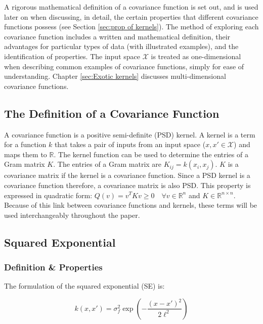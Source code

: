 \documentclass[12pt,a4paper]{article}
\begin{document}
A rigorous mathematical definition of a covariance function is set out, and is used later on when discussing, in detail, the certain properties that different covariance functions possess (see Section \ref{sec:prop of kernels}). The method of exploring each covariance function includes a written and mathematical definition, their advantages for particular types of data (with illustrated examples), and the identification of properties. The input space \(\mathcal{X}\) is treated as one-dimensional when describing common examples of covariance functions, simply for ease of understanding. Chapter \ref{sec:Exotic kernels} discusses multi-dimensional covariance functions.

\subsection{The Definition of a Covariance Function}
\label{sec:DefCov}

A covariance function is a positive semi-definite (PSD) kernel. A kernel is a term for a function \(k\) that takes a pair of inputs from an input space (\(x,x' \in \mathcal{X}\)) and maps them to \(\mathbb{R}\). The kernel function can be used to determine the entries of a Gram matrix \(K\). The entries of a Gram matrix are \(K_{ij} = k(x_i,x_j)\). \(K\) is a covariance matrix if the kernel is a covariance function. Since a PSD kernel is a covariance function therefore, a covariance matrix is also PSD. This property is expressed in quadratic form: \(Q(v) = v^TKv \geq 0 \quad \forall v \in \mathbb{R}^n\) and \(K \in \mathbb{R}^{n \times n}\). Because of this link between covariance functions and kernels, these terms will be used interchangeably throughout the paper.

\subsection{Squared Exponential}
\label{sec:SE}

\subsubsection{Definition \& Properties}

The formulation of the squared exponential (SE) is:

\begin{equation}
k(x,x') = \sigma_f^2 \exp\left(-\frac{(x - x')^2}{2\ell^2}\right)
\label{eq:SE}
\end{equation}
\end{document}

